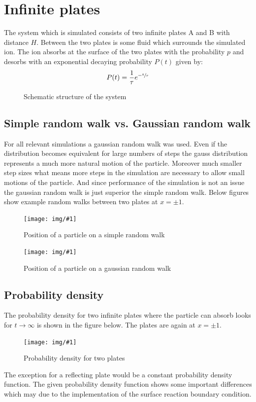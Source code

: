 \documentclass[a4paper, parskip=half]{scrartcl}
\newcommand{\myImage}[2]{
	\begin{figure}[H]
	\centering
	\texttt{[image: img/\#1]}
	\caption{#2}
	\label{pic:#1}
	\end{figure}
}
\newcommand{\myEqLabel}[1]{\label{eq:#1}}
\begin{document}
\newpage
\section{Infinite plates}
The system which is simulated consists of two infinite plates A and B with distance $H$. Between the two plates is some fluid which surrounds the simulated ion. The ion absorbs at the surface of the two plates with the probability $p$ and desorbs with an exponential decaying probability $P(t)$ given by:
\begin{align}
P(t) = \frac{1}{\tau}e^{- \sfrac{t}{\tau}} \myEqLabel{absorb_dist}
\end{align}
\begin{figure}[H]
\centering
{}
\caption{Schematic structure of the system}
\end{figure}
\subsection{Simple random walk vs. Gaussian random walk}

For all relevant simulations a gaussian random walk was used. Even if the distribution becomes equivalent for large numbers of steps the gauss distribution represents a much more natural motion of the particle. Moreover much smaller step sizes what means more steps in the simulation are necessary to allow small motions of the particle. And since performance of the simulation is not an issue the gaussian random walk is just superior the simple random walk. Below figures show example random walks between two plates at $x = \pm 1$.

\myImage{fixed_pos}{Position of a particle on a simple random walk}

\myImage{gauss_pos}{Position of a particle on a gaussian random walk}

\subsection{Probability density}
The probability density for two infinite plates where the particle can absorb looks for $t\rightarrow \infty$ is shown in the figure below. The plates are again at $x = \pm 1$.
\myImage{probability_density}{Probability density for two plates}
The exception for a reflecting plate would be a constant probability density function. The given probability density function shows some important differences which may due to the implementation of the surface reaction boundary condition. 
\end{document}
